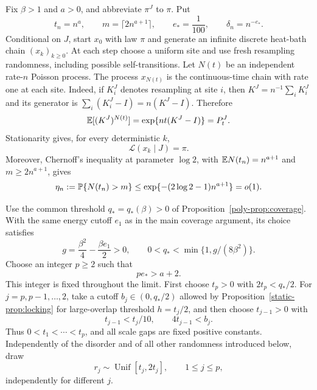 Fix $\beta>1$ and $a>0$, and abbreviate $\pi^J$ to $\pi$. Put
\begin{equation}\label{fixed-eq:time-parameters}
 t_n=n^a,\qquad m=\lceil2n^{a+1}\rceil,\qquad
 e_*=\frac1{100},\qquad \delta_n=n^{-e_*}.
\end{equation}
Conditional on $J$, start $x_0$ with law $\pi$ and generate an infinite
discrete heat-bath chain $(x_k)_{k\ge0}$. At each step choose a uniform
site and use fresh resampling randomness, including possible
self-transitions. Let $N(t)$ be an independent rate-$n$ Poisson process.
The process $x_{N(t)}$ is the continuous-time chain with rate one at each
site. Indeed, if $K_i^J$ denotes resampling at site $i$, then
$K^J=n^{-1}\sum_iK_i^J$ and its generator is
$\sum_i(K_i^J-I)=n(K^J-I)$. Therefore
\[
 \mathbb E[(K^J)^{N(t)}]=\exp\{nt(K^J-I)\}=P_t^J.
\]
Stationarity gives, for every deterministic $k$,
\begin{equation}\label{fixed-eq:stationary-marginal}
 \mathcal L(x_k\mid J)=\pi.
\end{equation}
Moreover, Chernoff's inequality at parameter $\log2$, with
$\mathbb E N(t_n)=n^{a+1}$ and $m\ge2n^{a+1}$, gives
\begin{equation}\label{fixed-eq:poisson-tail}
 \eta_n:=\mathbb P\{N(t_n)>m\}
 \le\exp\{-(2\log2-1)n^{a+1}\}=o(1).
\end{equation}

Use the common threshold $q_*=q_*(\beta)>0$ of
Proposition~\ref{poly-prop:coverage}. With the same energy cutoff $e_1$
as in the main coverage argument, its choice satisfies
\[
 g=\frac{\beta^2}{4}-\frac{\beta e_1}{2}>0,\qquad
 0<q_*<\min\{1,g/(8\beta^2)\}.
\]
Choose an integer $p\ge2$ such that
\begin{equation}\label{fixed-eq:depth-count}
 pe_*>a+2.
\end{equation}
This integer is fixed throughout the limit. First choose $t_p>0$ with
$2t_p<q_*/2$. For $j=p,p-1,\ldots,2$, take a cutoff
$b_j\in(0,q_*/2)$ allowed by Proposition~\ref{static-prop:locking}
for large-overlap threshold $h=t_j/2$, and then choose $t_{j-1}>0$ with
\begin{equation}\label{fixed-eq:separated-scales}
 t_{j-1}<t_j/10,\qquad 4t_{j-1}<b_j.
\end{equation}
Thus $0<t_1<\cdots<t_p$, and all scale gaps are fixed positive
constants. Independently of the disorder and of all other randomness
introduced below, draw
\begin{equation}\label{fixed-eq:thresholds}
 r_j\sim\operatorname{Unif}[t_j,2t_j],\qquad 1\le j\le p,
\end{equation}
independently for different $j$.

